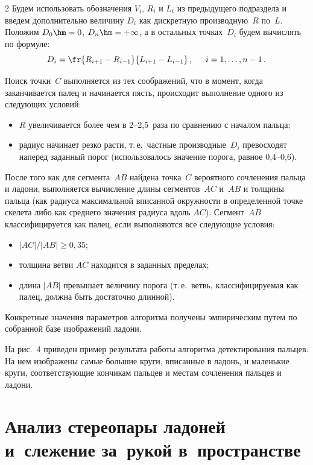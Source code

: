 \begin{multicols}{2}
Будем использовать обозначения $V_i$, $R_i$ и $L_i$ из предыдущего подраздела
и введем дополнительно величину $D_i$ как дискретную производную~$R$ по~$L$.
Положим $D_0 \hm= 0$, $D_n \hm= + \infty$, а в остальных точках~$D_i$ будем вычислять по формуле:
\begin{equation*}
D_i = \fr{R_{i+1} - R_{i-1}}{L_{i+1} - L_{i - 1}}\,,\enskip \quad i = 1,
\ldots, n-1\,.
\end{equation*}

Поиск точки~$C$ выполняется из тех соображений, что в момент, 
когда заканчивается палец и начинается пясть,
происходит выполнение одного из следующих условий:
\begin{itemize}
\item $R$ увеличивается более чем в 2--2,5~раза по сравнению с началом пальца;
\item радиус начинает резко расти, т.\,е.\ частные производные~$D_i$ 
превосходят наперед заданный порог (использовалось значение порога, рав\-ное 0,4--0,6).
\end{itemize}

После того как для сегмента~$AB$ найдена точка~$C$ вероятного
сочленения пальца и ладони, выполняется вычисление длины сегментов~$AC$ и~$AB$ 
и толщины пальца (как радиуса максимальной вписанной
окружности в определенной точке скелета либо как среднего значения
радиуса вдоль $AC$). Сегмент~$AB$ классифицируется как палец, если
выполняются все следующие условия:
\begin{itemize}
\item $|AC| / |AB| \ge 0{,}35$;
\item толщина ветви $AC$ находится в заданных пределах;
\item длина $|AB|$ превышает величину порога (т.\,е.\ 
ветвь, классифицируемая как палец, должна быть достаточно длинной).
\end{itemize}

Конкретные значения параметров алгоритма получены эмпирическим путем 
по собранной базе изображений ладони.

На рис.~4 приведен пример результата 
работы алгоритма детектирования пальцев.
На нем изображены самые большие круги, вписанные в ладонь,
и маленькие круги, соответствующие кончикам пальцев и местам сочленения пальцев и ладони.


\section{Анализ стереопары ладоней и~слежение за~рукой в~пространстве}\label{sec:HandTracking3D}


\end{multicols}
